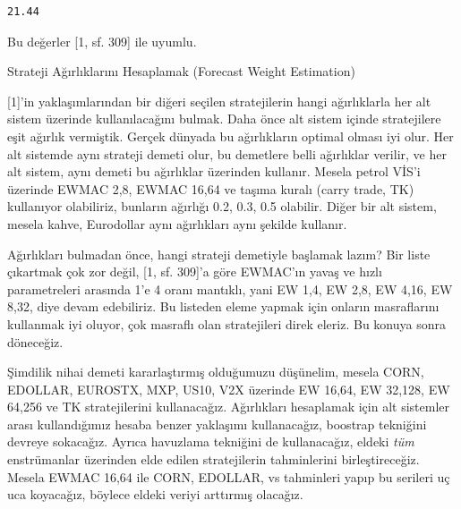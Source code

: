 \documentclass[12pt,fleqn]{article}\usepackage{../../common}
\begin{document}
\begin{verbatim}
21.44
\end{verbatim}

Bu değerler [1, sf. 309] ile uyumlu.

Strateji Ağırlıklarını Hesaplamak (Forecast Weight Estimation)

[1]'in yaklaşımlarından bir diğeri seçilen stratejilerin hangi ağırlıklarla her
alt sistem üzerinde kullanılacağını bulmak. Daha önce alt sistem içinde
stratejilere eşit ağırlık vermiştik. Gerçek dünyada bu ağırlıkların optimal
olması iyi olur. Her alt sistemde aynı strateji demeti olur, bu demetlere belli
ağırlıklar verilir, ve her alt sistem, aynı demeti bu ağırlıklar üzerinden
kullanır. Mesela petrol VİS'i üzerinde EWMAC 2,8, EWMAC 16,64 ve taşıma kuralı
(carry trade, TK) kullanıyor olabiliriz, bunların ağırlığı 0.2, 0.3, 0.5
olabilir. Diğer bir alt sistem, mesela kahve, Eurodollar aynı ağırlıkları aynı
şekilde kullanır.

Ağırlıkları bulmadan önce, hangi strateji demetiyle başlamak lazım? Bir liste
çıkartmak çok zor değil, [1, sf. 309]'a göre EWMAC'ın yavaş ve hızlı
parametreleri arasında 1'e 4 oranı mantıklı, yani EW 1,4, EW 2,8, EW 4,16, EW
8,32, diye devam edebiliriz. Bu listeden eleme yapmak için onların masraflarını
kullanmak iyi oluyor, çok masraflı olan stratejileri direk eleriz. Bu konuya
sonra döneceğiz.

Şimdilik nihai demeti kararlaştırmış olduğumuzu düşünelim, mesela CORN, EDOLLAR,
EUROSTX, MXP, US10, V2X üzerinde EW 16,64, EW 32,128, EW 64,256 ve TK
stratejilerini kullanacağız. Ağırlıkları hesaplamak için alt sistemler arası
kullandığımız hesaba benzer yaklaşımı kullanacağız, boostrap tekniğini devreye
sokacağız. Ayrıca havuzlama tekniğini de kullanacağız, eldeki {\em tüm}
enstrümanlar üzerinden elde edilen stratejilerin tahminlerini
birleştireceğiz. Mesela EWMAC 16,64 ile CORN, EDOLLAR, vs tahminleri yapıp bu
serileri uç uca koyacağız, böylece eldeki veriyi arttırmış olacağız.
\end{document}
